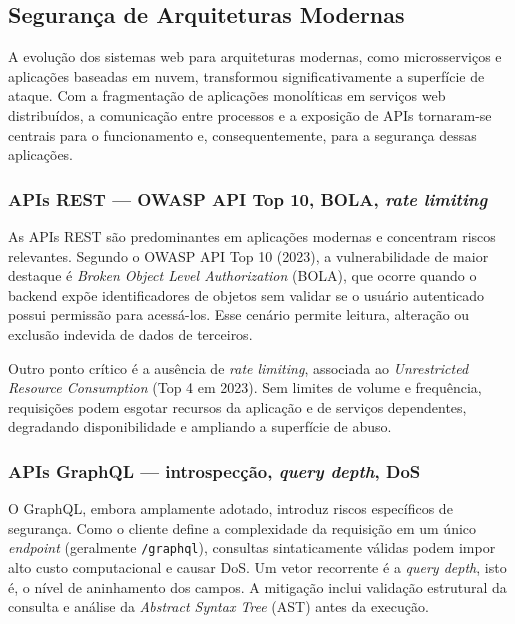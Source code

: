 \subsection{
    Segurança de Arquiteturas Modernas
}\label{sec:seguranca_arquiteturas_modernas}

A evolução dos sistemas web para arquiteturas modernas, como microsserviços e aplicações baseadas em nuvem, transformou significativamente a superfície de ataque. Com a fragmentação de aplicações monolíticas em serviços web distribuídos, a comunicação entre processos e a exposição de APIs tornaram-se centrais para o funcionamento e, consequentemente, para a segurança dessas aplicações.

\subsubsection{
    APIs REST — OWASP API Top 10, BOLA, \textit{rate limiting}
}\label{sec:apis_rest}

As APIs REST são predominantes em aplicações modernas e concentram riscos relevantes. Segundo o OWASP API Top 10 (2023), a vulnerabilidade de maior destaque é \textit{Broken Object Level Authorization} (BOLA), que ocorre quando o backend expõe identificadores de objetos sem validar se o usuário autenticado possui permissão para acessá-los. Esse cenário permite leitura, alteração ou exclusão indevida de dados de terceiros.

Outro ponto crítico é a ausência de \textit{rate limiting}, associada ao \textit{Unrestricted Resource Consumption} (Top 4 em 2023). Sem limites de volume e frequência, requisições podem esgotar recursos da aplicação e de serviços dependentes, degradando disponibilidade e ampliando a superfície de abuso.

\subsubsection{
    APIs GraphQL — introspecção, \textit{query depth}, DoS
}\label{sec:apis_graphql}

O GraphQL, embora amplamente adotado, introduz riscos específicos de segurança. Como o cliente define a complexidade da requisição em um único \textit{endpoint} (geralmente \texttt{/graphql}), consultas sintaticamente válidas podem impor alto custo computacional e causar DoS. Um vetor recorrente é a \textit{query depth}, isto é, o nível de aninhamento dos campos. A mitigação inclui validação estrutural da consulta e análise da \textit{Abstract Syntax Tree} (AST) antes da execução.

